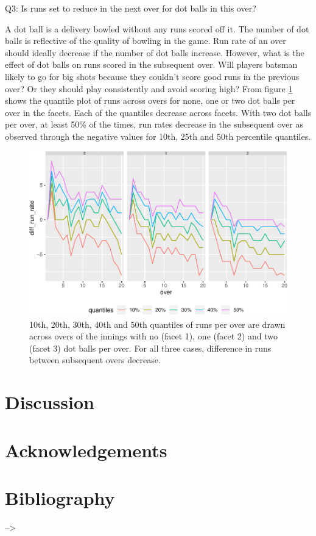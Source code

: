 \documentclass[12pt]{article}
\begin{document}
Q3: Is runs set to reduce in the next over for dot balls in this over?

A dot ball is a delivery bowled without any runs scored off it. The
number of dot balls is reflective of the quality of bowling in the game.
Run rate of an over should ideally decrease if the number of dot balls
increase. However, what is the effect of dot balls on runs scored in the
subsequent over. Will players batsman likely to go for big shots because
they couldn't score good runs in the previous over? Or they should play
consistently and avoid scoring high? From figure \ref{fig:exdot} shows
the quantile plot of runs across overs for none, one or two dot balls
per over in the facets. Each of the quantiles decrease across facets.
With two dot balls per over, at least 50\% of the times, run rates
decrease in the subsequent over as observed through the negative values
for 10th, 25th and 50th percentile quantiles.

\begin{figure}[htb]

{\centering \includegraphics[width=\textwidth]{figure/exdot-1} 

}

\caption{10th, 20th, 30th, 40th and 50th quantiles of runs per over are drawn  across overs of the innings with no (facet 1), one (facet 2) and two (facet 3) dot balls per over. For all three cases, difference in runs between subsequent overs decrease.}\label{fig:exdot}
\end{figure}

\hypertarget{sec:discussion}{%
\section{Discussion}\label{sec:discussion}}

\hypertarget{acknowledgements}{%
\section*{Acknowledgements}\label{acknowledgements}}

\hypertarget{bibliography}{%
\section{Bibliography}\label{bibliography}}

--\textgreater{}



\end{document}
